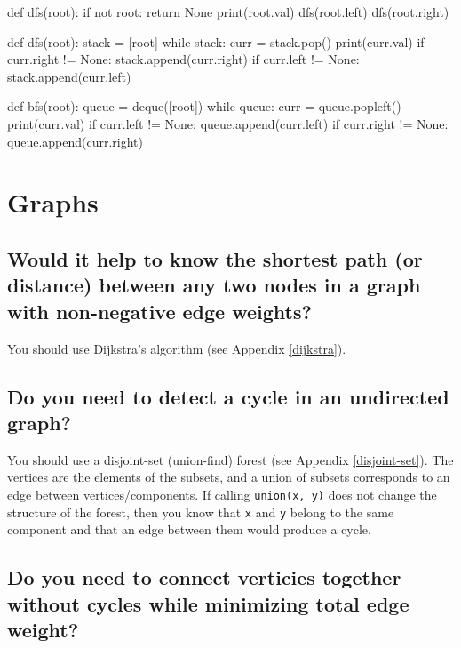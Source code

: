 \documentclass[12pt, titlepage]{article}
\begin{document}
\begin{python}
def dfs(root):
    if not root:
        return None
    print(root.val)
    dfs(root.left)
    dfs(root.right)
\end{python}

\begin{python}
def dfs(root):
    stack = [root]
    while stack:
    curr = stack.pop()
    print(curr.val)
    if curr.right != None:
        stack.append(curr.right)
    if curr.left != None:
        stack.append(curr.left)
\end{python}

\begin{python}
def bfs(root):
    queue = deque([root])
    while queue:
    curr = queue.popleft()
    print(curr.val)
    if curr.left != None:
        queue.append(curr.left)
    if curr.right != None:
        queue.append(curr.right)
\end{python}

\section{Graphs}

\subsection{Would it help to know the shortest path (or distance) between any two nodes in a graph with non-negative edge weights?}

You should use Dijkstra's algorithm (see Appendix \ref{dijkstra}).

\subsection{Do you need to detect a cycle in an undirected graph?}

You should use a disjoint-set (union-find) forest (see Appendix \ref{disjoint-set}). The vertices are the elements of the subsets, and a union of subsets corresponds to an edge between vertices/components. If calling \texttt{union(x, y)} does not change the structure of the forest, then you know that \texttt{x} and \texttt{y} belong to the same component and that an edge between them would produce a cycle.

\subsection{Do you need to connect verticies together without cycles while minimizing total edge weight?}
\end{document}
